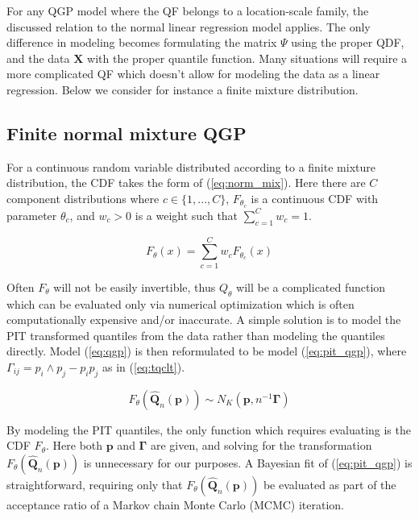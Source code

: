 \documentclass[preprint,12pt,authoryear]{elsarticle}
\begin{document}
For any QGP model where the QF belongs to a location-scale family, the discussed relation to the normal linear regression model applies. The only difference in modeling becomes formulating the matrix $\Psi$ using the proper QDF, and the data $\boldsymbol{X}$ with the proper quantile function. Many situations will require a more complicated QF which doesn't allow for modeling the data as a linear regression. Below we consider for instance a finite mixture distribution. 

\subsection{Finite normal mixture QGP}

For a continuous random variable distributed according to a finite mixture distribution, the CDF takes the form of (\ref{eq:norm_mix}). Here there are $C$ component distributions where $c \in \{1, ..., C\}$, $F_{\theta_c}$ is a continuous CDF with parameter $\theta_c$, and $w_c > 0$ is a weight such that $\sum_{c = 1}^C w_c = 1$. 

\begin{equation}
    \label{eq:norm_mix}
    F_{\theta}(x) = \sum_{c = 1}^C w_c F_{\theta_c}(x)
\end{equation}

Often $F_{\theta}$ will not be easily invertible, thus $Q_{\theta}$ will be a complicated function which can be evaluated only via numerical optimization which is often computationally expensive and/or inaccurate. A simple solution is to model the PIT transformed quantiles from the data rather than modeling the quantiles directly. Model (\ref{eq:qgp}) is then reformulated to be model (\ref{eq:pit_qgp}), where  $\Gamma_{ij} = p_i\wedge p_j - p_i p_j$ as in (\ref{eq:tqclt}).   

\begin{equation}
    \label{eq:pit_qgp}
F_{\theta}(\hat{\boldsymbol{Q}}_n(\boldsymbol{p})) \sim N_K(\boldsymbol{p}, n^{-1} \boldsymbol{\Gamma})
\end{equation}

By modeling the PIT quantiles, the only function which requires evaluating is the CDF $F_{\theta}$. Here both $\boldsymbol{p}$ and $\boldsymbol{\Gamma}$ are given, and solving for the transformation $F_{\theta}(\hat{\boldsymbol{Q}}_n(\boldsymbol{p}))$ is unnecessary for our purposes. A Bayesian fit of (\ref{eq:pit_qgp}) is straightforward, requiring only that $F_{\theta}(\hat{\boldsymbol{Q}}_n(\boldsymbol{p}))$ be evaluated as part of the acceptance ratio of a Markov chain Monte Carlo (MCMC) iteration. 
\end{document}
